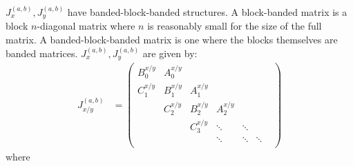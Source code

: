 \documentclass[11pt, oneside]{article}   	%
\begin{document}
$J_x^{(a,b)}, J_y^{(a,b)}$ have banded-block-banded structures. A block-banded matrix is a block $n$-diagonal matrix where $n$ is reasonably small for the size of the full matrix. A banded-block-banded matrix is one where the blocks themselves are banded matrices. $J_x^{(a,b)}, J_y^{(a,b)}$ are given by:
\begin{align*}
J_{x/y}^{(a,b)} &= \begin{pmatrix}
		B^{x/y}_0 & A^{x/y}_0 & & & & \\
		C^{x/y}_1 & B^{x/y}_1 & A^{x/y}_1 & & & \\
		& C^{x/y}_2 & B^{x/y}_2 & A^{x/y}_2  & & & \\
		& & C^{x/y}_3 & \ddots & \ddots & \\
		& & & \ddots & \ddots & \ddots \\
	\end{pmatrix}
\end{align*}
where
\end{document}
